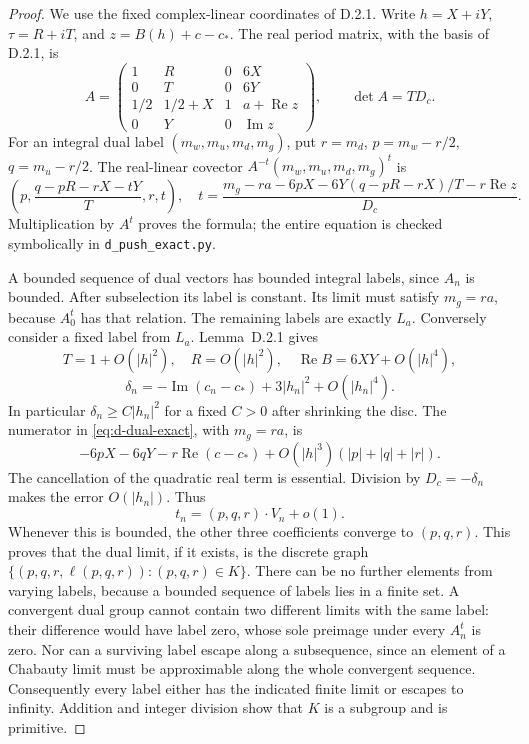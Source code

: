 \begin{proof}
We use the fixed complex-linear coordinates of D.2.1. Write
\(h=X+iY\), \(\tau=R+iT\), and
\(z=B(h)+c-c_*\). The real period matrix, with the basis of D.2.1,
is
\[
 A=\begin{pmatrix}
 1&R&0&6X\\
 0&T&0&6Y\\
 1/2&1/2+X&1&a+\operatorname{Re}z\\
 0&Y&0&\operatorname{Im}z
 \end{pmatrix},\qquad
 \det A=T D_c.
\]
For an integral dual label \((m_w,m_u,m_d,m_g)\), put
\(r=m_d\), \(p=m_w-r/2\), \(q=m_u-r/2\).
The real-linear covector \(A^{-t}(m_w,m_u,m_d,m_g)^t\) is
\begin{equation}\label{eq:d-dual-exact}
 \left(p,\frac{q-pR-rX-tY}{T},r,t\right),\quad
 t=\frac{m_g-ra-6pX-6Y(q-pR-rX)/T-r\operatorname{Re}z}{D_c}.
\end{equation}
Multiplication by \(A^t\) proves the formula; the entire equation is
checked symbolically in \texttt{d\_push\_exact.py}.

A bounded sequence of dual vectors has bounded integral labels,
since \(A_n\) is bounded. After subselection its label is constant.
Its limit must satisfy \(m_g=ra\), because
\(A_0^t\) has that relation. The remaining labels are exactly
\(L_a\). Conversely consider a fixed label from \(L_a\).
Lemma~D.2.1 gives
\[
 T=1+O(|h|^2),\quad R=O(|h|^2),\quad
 \operatorname{Re}B=6XY+O(|h|^4),
\]
\[
 \delta_n=-\operatorname{Im}(c_n-c_*)
                       +3|h_n|^2+O(|h_n|^4).
\]
In particular \(\delta_n\ge C|h_n|^2\) for a fixed \(C>0\)
after shrinking the disc. The numerator in
\eqref{eq:d-dual-exact}, with \(m_g=ra\), is
\[
 -6pX-6qY-r\operatorname{Re}(c-c_*)
       +O(|h|^3)(|p|+|q|+|r|).
\]
The cancellation of the quadratic real term is essential. Division
by \(D_c=-\delta_n\) makes the error \(O(|h_n|)\). Thus
\[
 t_n=(p,q,r)\cdot V_n+o(1).
\]
Whenever this is bounded, the other three coefficients converge to
\((p,q,r)\). This proves that the dual limit, if it exists, is the
discrete graph
\(\{(p,q,r,\ell(p,q,r)):(p,q,r)\in K\}\).
There can be no further elements from varying labels, because a
bounded sequence of labels lies in a finite set. A convergent dual
group cannot contain two different limits with the same label: their
difference would have label zero, whose sole preimage under every
\(A_n^t\) is zero. Nor can a surviving label escape along a
subsequence, since an element of a Chabauty limit must be approximable
along the whole convergent sequence. Consequently every label either
has the indicated finite limit or escapes to infinity. Addition and
integer division show that \(K\) is a subgroup and is primitive.


\end{proof}
